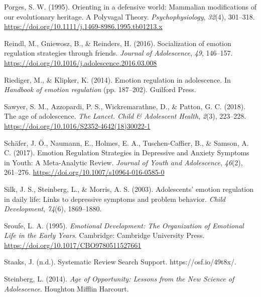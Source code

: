 \documentclass[
  english,
  man]{apa6}
\begin{document}
\leavevmode\hypertarget{ref-porgesOrientingDefensiveWorld1995}{}%
Porges, S. W. (1995). Orienting in a defensive world: Mammalian modifications of our evolutionary heritage. A Polyvagal Theory. \emph{Psychophysiology}, \emph{32}(4), 301--318. \url{https://doi.org/10.1111/j.1469-8986.1995.tb01213.x}

\leavevmode\hypertarget{ref-reindlSocializationEmotionRegulation2016}{}%
Reindl, M., Gniewosz, B., \& Reinders, H. (2016). Socialization of emotion regulation strategies through friends. \emph{Journal of Adolescence}, \emph{49}, 146--157. \url{https://doi.org/10.1016/j.adolescence.2016.03.008}

\leavevmode\hypertarget{ref-riedigerEmotionRegulationAdolescence2014}{}%
Riediger, M., \& Klipker, K. (2014). Emotion regulation in adolescence. In \emph{Handbook of emotion regulation} (pp. 187--202). Guilford Press.

\leavevmode\hypertarget{ref-sawyerAgeAdolescence2018}{}%
Sawyer, S. M., Azzopardi, P. S., Wickremarathne, D., \& Patton, G. C. (2018). The age of adolescence. \emph{The Lancet. Child \& Adolescent Health}, \emph{2}(3), 223--228. \url{https://doi.org/10.1016/S2352-4642(18)30022-1}

\leavevmode\hypertarget{ref-schaferEmotionRegulationStrategies2017}{}%
Schäfer, J. Ö., Naumann, E., Holmes, E. A., Tuschen-Caffier, B., \& Samson, A. C. (2017). Emotion Regulation Strategies in Depressive and Anxiety Symptoms in Youth: A Meta-Analytic Review. \emph{Journal of Youth and Adolescence}, \emph{46}(2), 261--276. \url{https://doi.org/10.1007/s10964-016-0585-0}

\leavevmode\hypertarget{ref-silkAdolescentsEmotionRegulation2003}{}%
Silk, J. S., Steinberg, L., \& Morris, A. S. (2003). Adolescents' emotion regulation in daily life: Links to depressive symptoms and problem behavior. \emph{Child Development}, \emph{74}(6), 1869--1880.

\leavevmode\hypertarget{ref-sroufeEmotionalDevelopmentOrganization1995}{}%
Sroufe, L. A. (1995). \emph{Emotional Development: The Organization of Emotional Life in the Early Years}. Cambridge: Cambridge University Press. \url{https://doi.org/10.1017/CBO9780511527661}

\leavevmode\hypertarget{ref-staaksSystematicReviewSearch}{}%
Staaks, J. (n.d.). Systematic Review Search Support. https://osf.io/49t8x/.

\leavevmode\hypertarget{ref-steinbergAgeOpportunityLessons2014}{}%
Steinberg, L. (2014). \emph{Age of Opportunity: Lessons from the New Science of Adolescence}. Houghton Mifflin Harcourt.
\end{document}

